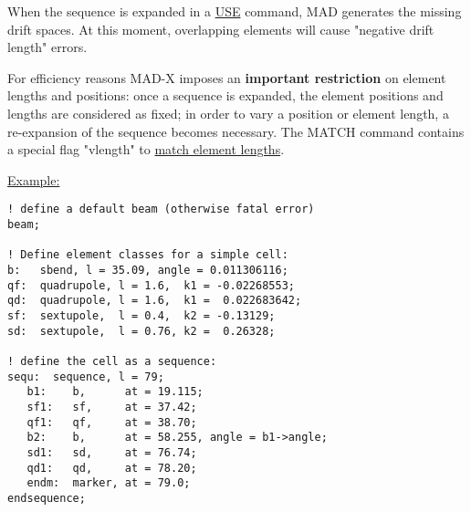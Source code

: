 When the sequence is expanded in a
\href{../control/general.html#use}{USE} command, MAD generates the
missing drift spaces. At this moment, overlapping elements will cause
"negative drift length" errors.  

For efficiency reasons MAD-X imposes an \textbf{important restriction}
on element lengths and positions: once a sequence is expanded, the
element positions and lengths are considered as fixed; in order to vary
a position or element length, a re-expansion of the sequence becomes
necessary. The MATCH command contains a special flag "vlength" to
\href{../match/match.html}{match element lengths}.  

\href{example}{Example:}
\begin{verbatim}
! define a default beam (otherwise fatal error)
beam;

! Define element classes for a simple cell:
b:   sbend, l = 35.09, angle = 0.011306116;
qf:  quadrupole, l = 1.6,  k1 = -0.02268553;
qd:  quadrupole, l = 1.6,  k1 =  0.022683642;
sf:  sextupole,  l = 0.4,  k2 = -0.13129;
sd:  sextupole,  l = 0.76, k2 =  0.26328;

! define the cell as a sequence:
sequ:  sequence, l = 79;
   b1:    b,      at = 19.115;
   sf1:   sf,     at = 37.42;
   qf1:   qf,     at = 38.70;
   b2:    b,      at = 58.255, angle = b1->angle;
   sd1:   sd,     at = 76.74;
   qd1:   qd,     at = 78.20;
   endm:  marker, at = 79.0;
endsequence;
\end{verbatim}

